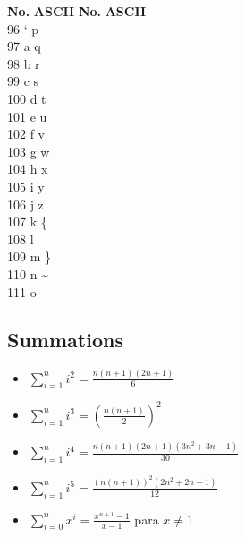 \documentclass[10pt,letterpaper,twocolumn,twosided]{article}
\begin{document}
\begin{tabbing}
\textbf{No.}\hspace{1cm} \=  \textbf{ASCII}\hspace{2cm} \= \textbf{No.}\hspace{1cm} \= \textbf{ASCII}\hspace{2cm}  \\ 
96 \> `  \> p \\
97 \> a  \> q \\
98 \> b  \> r \\
99 \> c  \> s \\
100 \> d  \> t \\
101 \> e  \> u \\
102 \> f  \> v \\
103 \> g  \> w \\
104 \> h  \> x \\
105 \> i  \> y \\
106 \> j  \> z \\
107 \> k  \> \{ \\
108 \> l  \> \textbar \\
109 \> m  \> \} \\
110 \> n  \> \textasciitilde \\
111 \> o  \>  \\  
\end{tabbing}

\subsection{Summations}

\begin{itemize}
\item	$\sum_{i=1}^{n} i^2 = \frac{n(n+1)(2n+1)}{6}$
\item	$\sum_{i=1}^{n} i^3 = (\frac{n(n+1)}{2})^2$
\item	$\sum_{i=1}^{n} i^4 = \frac{n(n+1)(2n+1)(3n^2+3n-1)}{30}$
\item	$\sum_{i=1}^{n} i^5 = \frac{(n(n+1))^2(2n^2+2n-1)}{12}$
\item	$\sum_{i=0}^{n} x^i = \frac{x^{n+1}-1}{x-1}$ para $x \neq 1$	
\end{itemize}
\end{document}
